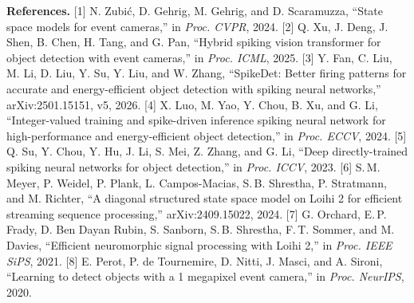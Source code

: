 \documentclass[11pt,a4paper]{article}
\begin{document}
\vspace{2pt}
{\footnotesize
\textbf{References.}
[1] N. Zubi\'c, D. Gehrig, M. Gehrig, and D. Scaramuzza, ``State space models for event cameras,'' in
\emph{Proc. CVPR}, 2024.\hspace{0.5em}
[2] Q. Xu, J. Deng, J. Shen, B. Chen, H. Tang, and G. Pan, ``Hybrid spiking vision transformer for object
detection with event cameras,'' in \emph{Proc. ICML}, 2025.\hspace{0.5em}
[3] Y. Fan, C. Liu, M. Li, D. Liu, Y. Su, Y. Liu, and W. Zhang, ``SpikeDet: Better firing patterns for accurate
and energy-efficient object detection with spiking neural networks,'' arXiv:2501.15151, v5, 2026.\hspace{0.5em}
[4] X. Luo, M. Yao, Y. Chou, B. Xu, and G. Li, ``Integer-valued training and spike-driven inference spiking
neural network for high-performance and energy-efficient object detection,'' in \emph{Proc. ECCV},
2024.\hspace{0.5em}
[5] Q. Su, Y. Chou, Y. Hu, J. Li, S. Mei, Z. Zhang, and G. Li, ``Deep directly-trained spiking neural networks
for object detection,'' in \emph{Proc. ICCV}, 2023.\hspace{0.5em}
[6] S.\,M. Meyer, P. Weidel, P. Plank, L. Campos-Macias, S.\,B. Shrestha, P. Stratmann, and M. Richter, ``A
diagonal structured state space model on Loihi 2 for efficient streaming sequence processing,''
arXiv:2409.15022, 2024.\hspace{0.5em}
[7] G. Orchard, E.\,P. Frady, D. Ben Dayan Rubin, S. Sanborn, S.\,B. Shrestha, F.\,T. Sommer, and M. Davies,
``Efficient neuromorphic signal processing with Loihi 2,'' in \emph{Proc. IEEE SiPS}, 2021.\hspace{0.5em}
[8] E. Perot, P. de Tournemire, D. Nitti, J. Masci, and A. Sironi, ``Learning to detect objects with a
1 megapixel event camera,'' in \emph{Proc. NeurIPS}, 2020.
\par}
\end{document}
